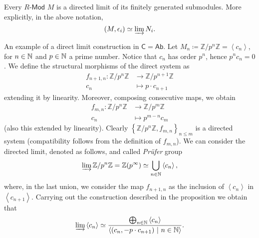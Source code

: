 \begin{prop}
	Every $R\text{-}\mathsf{Mod}$ $M$ is a directed limit of its finitely generated submodules.
	More explicitly, in the above notation,
	\begin{equation}
	\left(M, \epsilon_i\right) \simeq \varinjlim N_i
	.\end{equation} 
\end{prop} 

\begin{ex}
	An example of a direct limit construction in $\mathsf{C} = \mathsf{Ab}$.
	Let $M_n \coloneqq \mathbb{Z}/p^n\mathbb{Z} = \left\langle c_n \right\rangle$, for $n \in \mathbb{N}$ and $p \in \mathbb{N}$ a prime number.
	Notice that $c_n$ has order $p^n$, hence $p^n c_n = 0$.
	We define the structural morphisms of the direct system as
	\begin{align}
		f_{n+1, n}\colon \mathbb{Z}/p^n\mathbb{Z} &\to \mathbb{Z}/p^{n+1}\mathbb{Z} \\
		c_n &\mapsto p \cdot c_{n+1}
	\end{align} 
	extending it by linearity.
	Moreover, composing consecutive maps, we obtain
	\begin{align}
		f_{m, n}\colon \mathbb{Z}/p^n\mathbb{Z} &\to \mathbb{Z}/p^m\mathbb{Z} \\
		c_n &\mapsto p^{m-n} c_m
	\end{align} 
	(also this extended by linearity).
	Clearly $\left\{ \mathbb{Z}/p^n\mathbb{Z}, f_{m,n} \right\}_{n \leq m}$ is a directed system 
	(compatibility follows from the definition of $f_{m,n}$).
	We can consider the directed limit, denoted as follows, and called {\em Prüfer} group
	\begin{equation}
		\varinjlim \mathbb{Z}/p^n\mathbb{Z} = \mathbb{Z} (p^{\infty}) \simeq \bigcup_{n \in \mathbb{N}} \left\langle c_n \right\rangle
	,\end{equation} 
	where, in the last union, we consider the map $f_{n+1, n}$ as the inclusion of $\left\langle c_n \right\rangle$ in
	$\left\langle c_{n+1} \right\rangle$.
	Carrying out the construction described in the proposition we obtain that
	\begin{equation}
	\varinjlim \left\langle c_n \right\rangle \simeq
	\frac{\bigoplus_{n \in \mathbb{N}} \left\langle c_n \right\rangle}{\left\langle (c_n, -p \cdot c_{n+1}) \ \middle|\ n \in \mathbb{N} \right\rangle}
	.\end{equation} 
\end{ex} 

